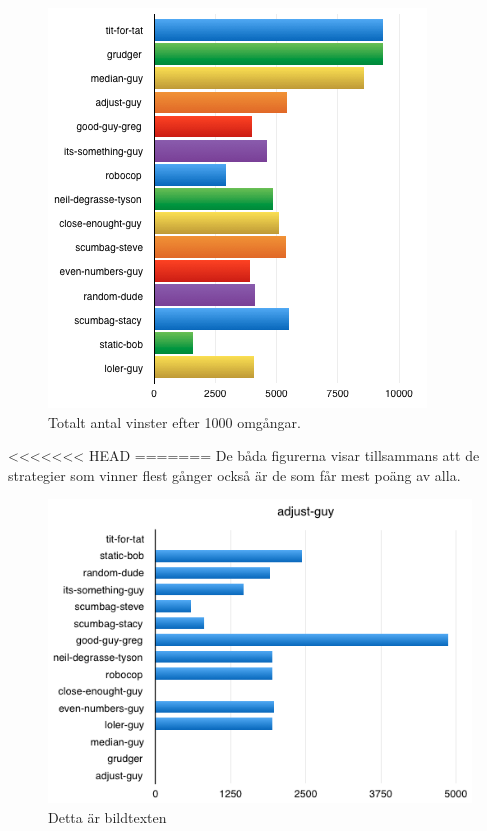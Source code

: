 \begin{figure}[htb]
	\begin{center}
	\includegraphics[scale=0.75, angle=0]{bilder/wins.png}
	\caption{Totalt antal vinster efter 1000 omgångar.}
	\label{wins}
	\end{center}
\end{figure}

<<<<<<< HEAD
=======
De båda figurerna visar tillsammans att de strategier som vinner flest gånger också är de som får mest poäng av alla. 

\begin{figure}[htb]
	\begin{center}
	\includegraphics[scale=0.75, angle=0]{bilder/adjust-guy.png}
	\caption{Detta är bildtexten}
	\label{adjust-guy}
	\end{center}
\end{figure}

